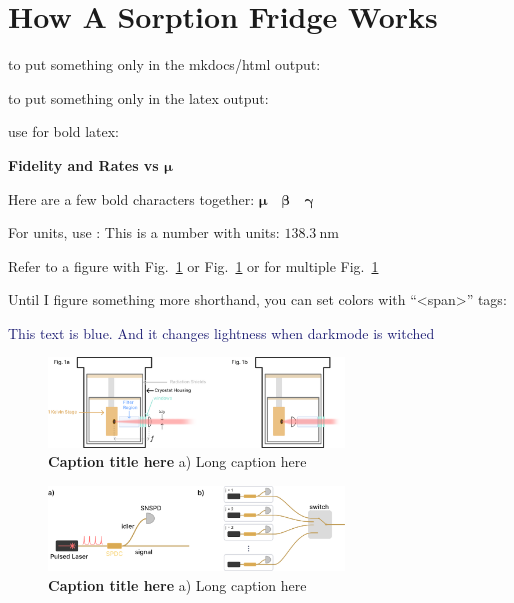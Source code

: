 \documentclass[11pt]{caltech_thesis} %
\begin{document}
\hypertarget{how-a-sorption-fridge-works}{%
\section{How A Sorption Fridge
Works}\label{how-a-sorption-fridge-works}}

to put something only in the mkdocs/html output:

to put something only in the latex output:

use \boldsymbol for bold latex:

\textbf{Fidelity and Rates vs $\boldsymbol \mu$}

Here are a few bold characters together:
$\boldsymbol{\mu \quad \beta \quad \gamma}$

For units, use : This is a number with units:
$138.3~\mathrm{nm}$

Refer to a figure with Fig.~\ref{fig:figurename} or
Fig.~\ref{fig:figurename} or for multiple Fig.~\ref{fig:figurename}

Until I figure something more shorthand, you can set colors with
``\textless span\textgreater{}'' tags:

\textcolor{midnightblue}{ This text is blue. And it changes lightness
when darkmode is witched }

\hypertarget{fig:figurename}{%
\begin{figure}
\centering
\includegraphics[width=0.7\textwidth,height=\textheight]{chapter_06/figs_06/fig1b_light.pdf}
\caption[{Figure label for in thesis index here.}]{\textbf{Caption title
here} a) Long caption here}
\label{fig:figurename}
\end{figure}
}

\hypertarget{fig:figurename2}{%
\begin{figure}
\centering
\includegraphics[width=0.7\textwidth,height=\textheight]{chapter_06/figs_06/hsps_light.pdf}
\caption[{Figure label for in thesis index here.}]{\textbf{Caption title
here} a) Long caption here}
\label{fig:figurename2}
\end{figure}
}
\end{document}

